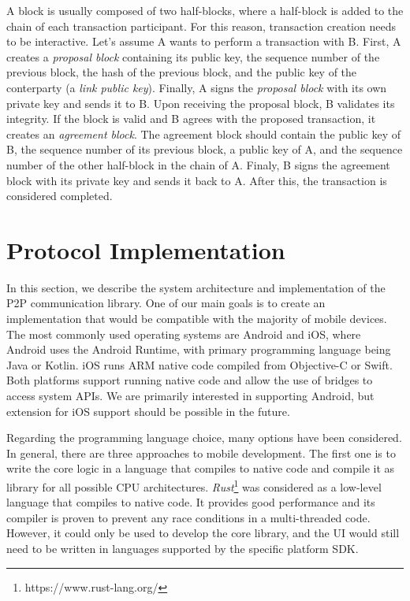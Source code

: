 A block is usually composed of two half-blocks, where a half-block is added to the chain of each transaction participant. For this reason, transaction creation needs to be interactive. Let's assume A wants to perform a transaction with B. First, A creates a \textit{proposal block} containing its public key, the sequence number of the previous block, the hash of the previous block, and the public key of the conterparty (a \textit{link public key}). Finally, A signs the \textit{proposal block} with its own private key and sends it to B. Upon receiving the proposal block, B validates its integrity. If the block is valid and B agrees with the proposed transaction, it creates an \textit{agreement block}. The agreement block should contain the public key of B, the sequence number of its previous block, a public key of A, and the sequence number of the other half-block in the chain of A. Finaly, B signs the agreement block with its private key and sends it back to A. After this, the transaction is considered completed.


\chapter{Protocol Implementation}
\label{implementation}

In this section, we describe the system architecture and implementation of the P2P communication library. One of our main goals is to create an implementation that would be compatible with the majority of mobile devices. The most commonly used operating systems are Android and iOS, where Android uses the Android Runtime, with primary programming language being Java or Kotlin. iOS runs ARM native code compiled from Objective-C or Swift. Both platforms support running native code and allow the use of bridges to access system APIs. We are primarily interested in supporting Android, but extension for iOS support should be possible in the future.

Regarding the programming language choice, many options have been considered. In general, there are three approaches to mobile development. The first one is to write the core logic in a language that compiles to native code and compile it as library for all possible CPU architectures. \textit{Rust}\footnote{https://www.rust-lang.org/} was considered as a low-level language that compiles to native code. It provides good performance and its compiler is proven to prevent any race conditions in a multi-threaded code. However, it could only be used to develop the core library, and the UI would still need to be written in languages supported by the specific platform SDK.

